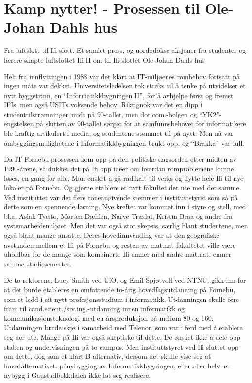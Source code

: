 \documentclass[../../main.tex]{subfiles}
\begin{document}
\chapter[Ifi 2]{Kamp nytter! - Prosessen til Ole-Johan Dahls hus}

\author{Narve Trædal}


Fra luftslott til Ifi-slott. Et samlet press, og uordodokse aksjoner fra studenter og lærere skapte luftslottet Ifi II om til Ifi-slottet Ole-Johan Dahls hus

Helt fra innflyttingen i 1988 var det klart at IT-miljøenes rombehov fortsatt på ingen måte var dekket. Universitetsledelsen tok straks til å tenke på utvidelser et nytt byggetrinn, en ``Informatikkbygningen II'', for å avhjelpe først og fremst IFIs, men også USITs voksende behov. Riktignok var det en dipp i studenttilstrømningen midt på 90-tallet, men dot.com.-bølgen og ``YK2''- engstelsen på slutten av 90-tallet sørget for at samfunnsbehovet for informatikere ble kraftig artikulert i media, og studentene stømmet til på nytt. Men nå var ombyggingsmulighetene i Informatikkbygningen brukt opp, og ``Brakka'' var full.

Da IT-Fornebu-prosessen kom opp på den politiske dagsorden etter midten av 1990-årene, så dukket det på Ifi opp ideer om hvordan romproblemene kunne løses, en gang for alle. Man ønsket å gå radikalt til verks og flytte hele Ifi til nye lokaler på Fornebu. Og gjerne etablere et nytt fakultet der ute med det samme. Ved instituttet var det flere toneangivende stemmer i instituttstyret som så på dette som en spennende løsning. Nye krefter var kommet inn i styre og stell, med bl.a. Aslak Tveito, Morten Dæhlen, Narve Trædal, Kristin Braa og andre fra systemarbeidsmiljøet. Men det var også stor skepsis, særlig blant studentene, men også blant mange ansatte. Deres hovedinnvending var at den geografiske avstanden mellom et Ifi på Fornebu og resten av mat.nat-fakultetet ville være uholdbar for de mange som kombinerte Ifi-emner med andre mat.nat.-emner samme studiesemester.

De to rektorene; Lucy Smith ved UiO, og Emil Spjøtvoll ved NTNU, gikk inn for at det burde etableres en omfattende to-årig hovedfagsutdanning på Fornebu, som et ledd i eit nytt profesjonsstudium i informatikk. Utdanningen skulle føre fram til cand.scient./siv.ing.-utdanning innen informatikk og
kommunikasjonsteknologi med en årsproduksjon på mellom 80 og 160. Utdanningen burde skje i samarbeid med Telenor, som var i ferd med å etablere seg der ute. Mange på Ifi var også skeptiske til dette. De ønsket ikke å dele opp staben og undervisningen på to campus. Men instituttstyret ved Ifi sluttet opp om dette, dog som et klart B-alternativ, dersom det skulle vise seg at hovedalternativet: pånybygging av Informatikkbygningen, eller aller helst et nybygg i Gaustadbekkdalen ikke lot seg realisere.
\end{document}
